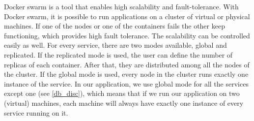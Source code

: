 Docker swarm is a tool that enables high scalability and fault-tolerance. With Docker swarm, it is possible to run applications on a cluster of virtual or physical machines. If one of the nodes or one of the containers fails the other keep functioning, which provides high fault tolerance. The scalability can be controlled easily as well. For every service, there are two modes available, global and replicated. If  the replicated mode is used, the user can define the number of replicas of each container. After that, they are distributed among all the nodes of the cluster. If the global mode is used, every node in the cluster runs exactly one instance of the service. In our application, we use global mode for all the services except one (see \ref{db_disc}), which means that if we run our application on two (virtual) machines, each machine will always have exactly one instance of every service running on it.
